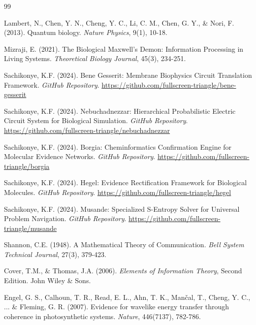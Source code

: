 \documentclass[12pt,a4paper]{article}
\begin{document}
\begin{thebibliography}{99}

Lambert, N., Chen, Y. N., Cheng, Y. C., Li, C. M., Chen, G. Y., \& Nori, F. (2013). Quantum biology. \textit{Nature Physics}, 9(1), 10-18.

Mizraji, E. (2021). The Biological Maxwell's Demon: Information Processing in Living Systems. \textit{Theoretical Biology Journal}, 45(3), 234-251.

Sachikonye, K.F. (2024). Bene Gesserit: Membrane Biophysics Circuit Translation Framework. \textit{GitHub Repository}. \url{https://github.com/fullscreen-triangle/bene-gesserit}

Sachikonye, K.F. (2024). Nebuchadnezzar: Hierarchical Probabilistic Electric Circuit System for Biological Simulation. \textit{GitHub Repository}. \url{https://github.com/fullscreen-triangle/nebuchadnezzar}

Sachikonye, K.F. (2024). Borgia: Cheminformatics Confirmation Engine for Molecular Evidence Networks. \textit{GitHub Repository}. \url{https://github.com/fullscreen-triangle/borgia}

Sachikonye, K.F. (2024). Hegel: Evidence Rectification Framework for Biological Molecules. \textit{GitHub Repository}. \url{https://github.com/fullscreen-triangle/hegel}

Sachikonye, K.F. (2024). Musande: Specialized S-Entropy Solver for Universal Problem Navigation. \textit{GitHub Repository}. \url{https://github.com/fullscreen-triangle/musande}

Shannon, C.E. (1948). A Mathematical Theory of Communication. \textit{Bell System Technical Journal}, 27(3), 379-423.

Cover, T.M., \& Thomas, J.A. (2006). \textit{Elements of Information Theory}, Second Edition. John Wiley \& Sons.

Engel, G. S., Calhoun, T. R., Read, E. L., Ahn, T. K., Mančal, T., Cheng, Y. C., ... \& Fleming, G. R. (2007). Evidence for wavelike energy transfer through coherence in photosynthetic systems. \textit{Nature}, 446(7137), 782-786.

\end{thebibliography}
\end{document}

